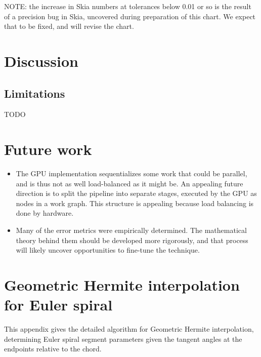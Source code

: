 \documentclass[sigconf, authordraft]{acmart}
\begin{document}
NOTE: the increase in Skia numbers at tolerances below 0.01 or so is the result of a precision bug in Skia, uncovered during preparation of this chart. We expect that to be fixed, and will revise the chart.


\section{Discussion}
\subsection{Limitations}

TODO

\section{Future work}

\begin{itemize}
    \item The GPU implementation sequentializes some work that could be parallel, and is thus not as well load-balanced as it might be. An appealing future direction is to split the pipeline into separate stages, executed by the GPU as nodes in a work graph\cite{Patel2024}. This structure is appealing because load balancing is done by hardware.

    \item Many of the error metrics were empirically determined. The mathematical theory behind them should be developed more rigorously, and that process will likely uncover opportunities to fine-tune the technique.
\end{itemize}





\appendix

\section{Geometric Hermite interpolation for Euler spiral}
\label{appendix:gh}

This appendix gives the detailed algorithm for Geometric Hermite interpolation, determining Euler spiral segment parameters given the tangent angles at the endpoints relative to the chord.
\end{document}

